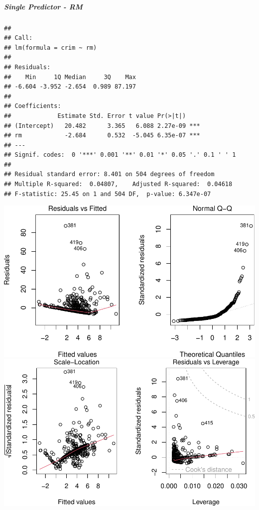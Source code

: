 \documentclass[
]{article}
\begin{document}
\hypertarget{single-predictor---rm}{%
\subparagraph{\texorpdfstring{\textbf{Single Predictor -
RM}}{Single Predictor - RM}}\label{single-predictor---rm}}

\begin{verbatim}
## 
## Call:
## lm(formula = crim ~ rm)
## 
## Residuals:
##    Min     1Q Median     3Q    Max 
## -6.604 -3.952 -2.654  0.989 87.197 
## 
## Coefficients:
##             Estimate Std. Error t value Pr(>|t|)    
## (Intercept)   20.482      3.365   6.088 2.27e-09 ***
## rm            -2.684      0.532  -5.045 6.35e-07 ***
## ---
## Signif. codes:  0 '***' 0.001 '**' 0.01 '*' 0.05 '.' 0.1 ' ' 1
## 
## Residual standard error: 8.401 on 504 degrees of freedom
## Multiple R-squared:  0.04807,    Adjusted R-squared:  0.04618 
## F-statistic: 25.45 on 1 and 504 DF,  p-value: 6.347e-07
\end{verbatim}

\includegraphics{Disha_Gandhi_Take_Home_Exam_PDF_files/figure-latex/unnamed-chunk-22-1.pdf}
\includegraphics{Disha_Gandhi_Take_Home_Exam_PDF_files/figure-latex/unnamed-chunk-22-2.pdf}
\end{document}
